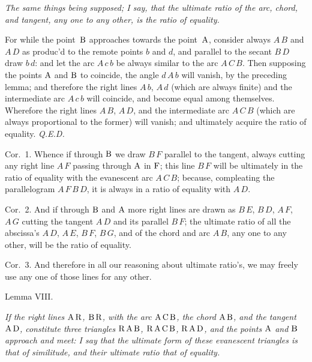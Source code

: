 \nobreak\bigskip

{\it
The same things being supposed; I say, that the ultimate ratio of
the arc, chord, and tangent, any one to any other, is the ratio
of equality.}

\bigbreak

For while the point~${\rm B}$ approaches towards the
point~${\rm A}$, consider always $A \, B$ and $A \, D$ as
produc'd to the remote points $b$ and $d$, and
parallel to the secant $B \, D$ draw $b \, d$: and let the arc
$A \, c \, b$ be always similar to the arc $A \, C \, B$.  Then
supposing the points ${\rm A}$ and ${\rm B}$ to coincide, the
angle $d \, A \, b$ will vanish, by the preceding lemma; and
therefore the right lines $A \, b$, $A \, d$ (which are always
finite) and the intermediate arc $A \, c \, b$ will coincide, and
become equal among themselves.  Wherefore the right lines
$A \, B$, $A \, D$, and the intermediate arc $A \, C \, B$ (which
are always proportional to the former) will vanish; and
ultimately acquire the ratio of equality.
{\it Q.E.D.}

\midinsert
\centerline{}
\endinsert

{\sc Cor.}~1.
Whence if through ${\rm B}$ we draw $B \, F$ parallel to the
tangent, always cutting any right line $A \, F$ passing through
${\rm A}$ in ${\rm F}$; this line $B \, F$ will be ultimately in
the ratio of equality with the evanescent arc $A \, C \, B$;
because, compleating the parallelogram $A \, F \, B \, D$, it is
always in a ratio of equality with $A \, D$.

{\sc Cor.}~2.
And if through ${\rm B}$ and ${\rm A}$ more right lines are drawn
as $B \, E$, $B \, D$, $A \, F$, $A \, G$ cutting the tangent
$A \, D$ and its parallel $B \, F$; the ultimate ratio of all the
abscissa's $A \, D$, $A \, E$, $B \, F$, $B \, G$, and of the
chord and arc $A \, B$, any one to any other, will be the ratio
of equality.

{\sc Cor.}~3.
And therefore in all our reasoning about ultimate ratio's, we may
freely use any one of those lines for any other.

\bigbreak

\centerline{\largesc Lemma VIII.}

\nobreak\bigskip

{\it
If the right lines ${\rm A} \, {\rm R}$, ${\rm B} \, {\rm R}$,
with the arc ${\rm A} \, {\rm C} \, {\rm B}$, the chord
${\rm A} \, {\rm B}$, and the tangent ${\rm A} \, {\rm D}$,
constitute three triangles
${\rm R} \, {\rm A} \, {\rm B}$,
${\rm R} \, {\rm A} \, {\rm C} \, {\rm B}$,
${\rm R} \, {\rm A} \, {\rm D}$,
and the points ${\rm A}$ and ${\rm B}$ approach and meet: I say
that the ultimate form of these evanescent triangles is that of
similitude, and their ultimate ratio that of equality.}

